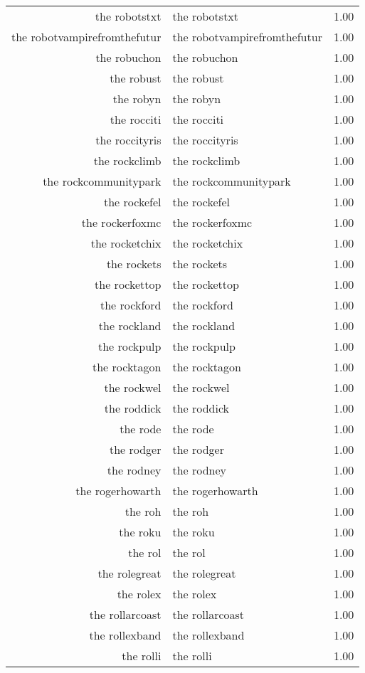 \begin{table}[ht]
\begin{tabular}{rlr}
  the robotstxt & the robotstxt & 1.00 \\ 
  the robotvampirefromthefutur & the robotvampirefromthefutur & 1.00 \\ 
  the robuchon & the robuchon & 1.00 \\ 
  the robust & the robust & 1.00 \\ 
  the robyn & the robyn & 1.00 \\ 
  the rocciti & the rocciti & 1.00 \\ 
  the roccityris & the roccityris & 1.00 \\ 
  the rockclimb & the rockclimb & 1.00 \\ 
  the rockcommunitypark & the rockcommunitypark & 1.00 \\ 
  the rockefel & the rockefel & 1.00 \\ 
  the rockerfoxmc & the rockerfoxmc & 1.00 \\ 
  the rocketchix & the rocketchix & 1.00 \\ 
  the rockets & the rockets & 1.00 \\ 
  the rockettop & the rockettop & 1.00 \\ 
  the rockford & the rockford & 1.00 \\ 
  the rockland & the rockland & 1.00 \\ 
  the rockpulp & the rockpulp & 1.00 \\ 
  the rocktagon & the rocktagon & 1.00 \\ 
  the rockwel & the rockwel & 1.00 \\ 
  the roddick & the roddick & 1.00 \\ 
  the rode & the rode & 1.00 \\ 
  the rodger & the rodger & 1.00 \\ 
  the rodney & the rodney & 1.00 \\ 
  the rogerhowarth & the rogerhowarth & 1.00 \\ 
  the roh & the roh & 1.00 \\ 
  the roku & the roku & 1.00 \\ 
  the rol & the rol & 1.00 \\ 
  the rolegreat & the rolegreat & 1.00 \\ 
  the rolex & the rolex & 1.00 \\ 
  the rollarcoast & the rollarcoast & 1.00 \\ 
  the rollexband & the rollexband & 1.00 \\ 
  the rolli & the rolli & 1.00 \\ 

\end{tabular}
\end{table}
